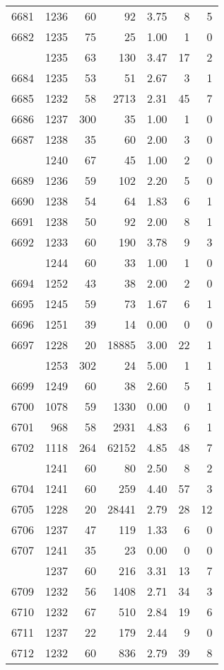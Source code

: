 \documentclass[
]{article}
\begin{document}
\begin{table}
\begin{tabular}[t]{lrrrrrr}
6681 & 1236 & 60 & 92 & 3.75 & 8 & 5\\
6682 & 1235 & 75 & 25 & 1.00 & 1 & 0\\
\addlinespace
6683 & 1235 & 63 & 130 & 3.47 & 17 & 2\\
6684 & 1235 & 53 & 51 & 2.67 & 3 & 1\\
6685 & 1232 & 58 & 2713 & 2.31 & 45 & 7\\
6686 & 1237 & 300 & 35 & 1.00 & 1 & 0\\
6687 & 1238 & 35 & 60 & 2.00 & 3 & 0\\
\addlinespace
6688 & 1240 & 67 & 45 & 1.00 & 2 & 0\\
6689 & 1236 & 59 & 102 & 2.20 & 5 & 0\\
6690 & 1238 & 54 & 64 & 1.83 & 6 & 1\\
6691 & 1238 & 50 & 92 & 2.00 & 8 & 1\\
6692 & 1233 & 60 & 190 & 3.78 & 9 & 3\\
\addlinespace
6693 & 1244 & 60 & 33 & 1.00 & 1 & 0\\
6694 & 1252 & 43 & 38 & 2.00 & 2 & 0\\
6695 & 1245 & 59 & 73 & 1.67 & 6 & 1\\
6696 & 1251 & 39 & 14 & 0.00 & 0 & 0\\
6697 & 1228 & 20 & 18885 & 3.00 & 22 & 1\\
\addlinespace
6698 & 1253 & 302 & 24 & 5.00 & 1 & 1\\
6699 & 1249 & 60 & 38 & 2.60 & 5 & 1\\
6700 & 1078 & 59 & 1330 & 0.00 & 0 & 1\\
6701 & 968 & 58 & 2931 & 4.83 & 6 & 1\\
6702 & 1118 & 264 & 62152 & 4.85 & 48 & 7\\
\addlinespace
6703 & 1241 & 60 & 80 & 2.50 & 8 & 2\\
6704 & 1241 & 60 & 259 & 4.40 & 57 & 3\\
6705 & 1228 & 20 & 28441 & 2.79 & 28 & 12\\
6706 & 1237 & 47 & 119 & 1.33 & 6 & 0\\
6707 & 1241 & 35 & 23 & 0.00 & 0 & 0\\
\addlinespace
6708 & 1237 & 60 & 216 & 3.31 & 13 & 7\\
6709 & 1232 & 56 & 1408 & 2.71 & 34 & 3\\
6710 & 1232 & 67 & 510 & 2.84 & 19 & 6\\
6711 & 1237 & 22 & 179 & 2.44 & 9 & 0\\
6712 & 1232 & 60 & 836 & 2.79 & 39 & 8\\

\end{tabular}
\end{table}
\end{document}
